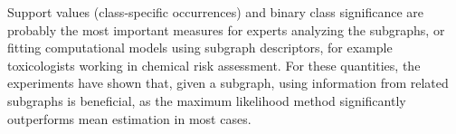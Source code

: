 \documentclass{sig-alternate}
\begin{document}
Support values (class-specific occurrences) and binary class significance are probably the
most important measures for experts analyzing the subgraphs, or fitting computational models using subgraph descriptors, 
for example toxicologists working in chemical risk assessment. 
For these quantities, the experiments have shown that, given a subgraph, using information from related subgraphs is beneficial, as the maximum
likelihood method significantly outperforms mean estimation in most cases.




\end{document}
